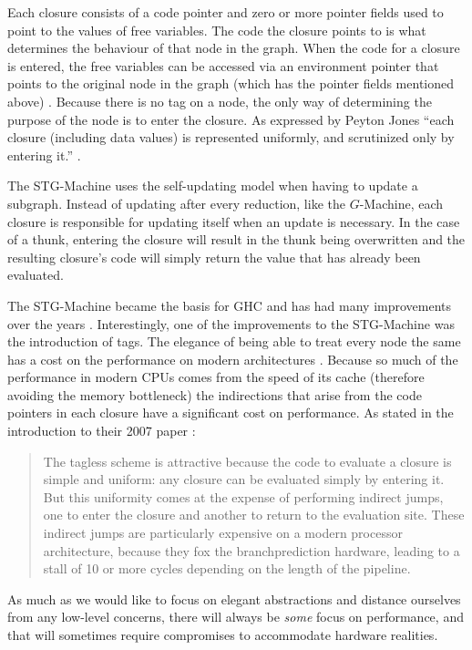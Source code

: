 Each closure consists of a code pointer and zero or more pointer fields used to
point to the values of free variables. The code the closure points to is what
determines the behaviour of that node in the graph. When the code for a closure
is entered, the free variables can be accessed via an environment pointer that
points to the original node in the graph (which has the pointer fields
mentioned above) \citep{jones1992implementing}. Because there is no tag on a
node, the only way of determining the purpose of the node is to enter the
closure. As expressed by Peyton Jones ``each closure (including data values) is
represented uniformly, and scrutinized only by entering it.''
\citep{jones1992implementing}.

The STG-Machine uses the self-updating model when having to update a subgraph.
Instead of updating after every reduction, like the $G$-Machine, each closure
is responsible for updating itself when an update is necessary. In the case of
a thunk, entering the closure will result in the thunk being overwritten and
the resulting closure's code will simply return the value that has already been
evaluated.

The STG-Machine became the basis for GHC and has had many improvements over the
years \citep{HistoryOfHaskell}. Interestingly, one of the improvements to the
STG-Machine was the introduction of tags. The elegance of being able to treat
every node the same has a cost on the performance on modern architectures
\citep{marlow2007faster}.  Because so much of the performance in modern CPUs
comes from the speed of its cache (therefore avoiding the memory
bottleneck) the indirections that arise from the code pointers in each closure
have a significant cost on performance. As stated in the introduction to their
2007 paper \citep{marlow2007faster}:

\begin{quote}
The tagless scheme is attractive because the code to evaluate a closure is
simple and uniform: any closure can be evaluated simply by
entering it. But this uniformity comes at the expense of performing indirect
jumps, one to enter the closure and another to return to
the evaluation site. These indirect jumps are particularly expensive
on a modern processor architecture, because they fox the branchprediction
hardware, leading to a stall of 10 or more cycles depending on the length of the
pipeline.
\end{quote}

As much as we would like to focus on elegant abstractions and distance
ourselves from any low-level concerns, there will always be \emph{some} focus
on performance, and that will sometimes require compromises to accommodate
hardware realities.
